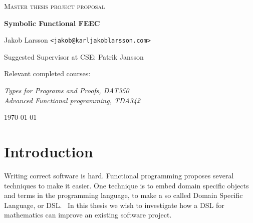 \documentclass{scrartcl}
\begin{document}
\begin{titlepage}

\centering
{\scshape\LARGE Master thesis project proposal}

\vspace{0.5cm}
{\huge\bfseries Symbolic Functional FEEC}

\vspace{2cm}
{\Large Jakob Larsson \texttt{<jakob@karljakoblarsson.com>}}

\vspace{1.0cm}
{\large Suggested Supervisor at CSE: Patrik Jansson }


\vspace{1.5cm}
{\large Relevant completed courses:}

{\itshape
Types for Programs and Proofs, DAT350 \\
Advanced Functional programming, TDA342 \\
}


\vfill
{\large \today}

\end{titlepage}


%
%

\section{Introduction}


Writing correct software is hard.
Functional programming proposes several techniques to make it easier.
One technique is to embed domain specific objects and terms in the programming
language, to make a so called Domain Specific Language, or DSL.~\cite{van2000domain}
In this thesis we wish to investigate how a DSL
for mathematics can improve an existing software project.
\end{document}

